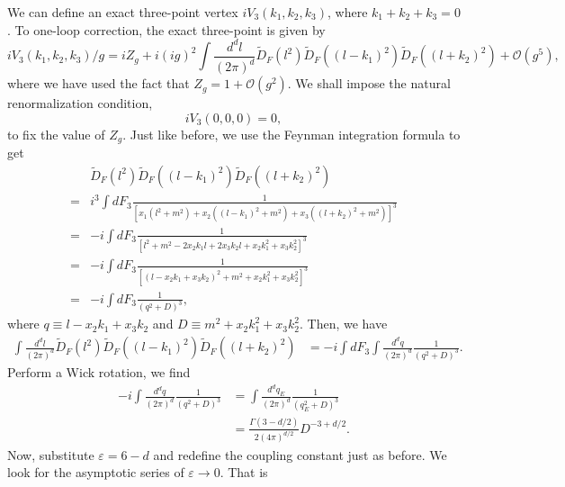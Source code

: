We can define an exact three-point vertex $iV_3(k_1,k_2,k_3)$, where $k_1+k_2+k_3 =0$. To one-loop correction, the exact three-point is given by
\begin{equation}
    iV_3(k_1, k_2,k_3)/g = iZ_g  + i(ig)^2\int\frac{d^dl}{(2\pi)^d}\tilde{D}_F(l^2)\tilde{D}_F((l-k_1)^2) \tilde{D}_F((l+k_2)^2) + \mathcal{O}(g^5),    
\end{equation}
where we have used the fact that $Z_g = 1 + \mathcal{O}(g^2)$. We shall impose the natural renormalization condition,
\begin{equation}
    iV_3(0,0,0) = 0,
\end{equation}
to fix the value of $Z_g$. Just like before, we use the Feynman integration formula to get
\begin{equation}
\begin{aligned}
    &\tilde{D}_F(l^2)\tilde{D}_F((l-k_1)^2) \tilde{D}_F((l+k_2)^2)\\ =& i^3\int dF_3\frac{1}{[x_1(l^2+m^2) + x_2((l-k_1)^2+m^2) + x_3((l+k_2)^2+m^2)]^3}\\
    =&-i\int dF_3\frac{1}{[l^2+m^2-2x_2k_1l + 2x_3k_2l+x_2k_1^2 + x_3k_2^2]^3}\\
    =&-i\int dF_3\frac{1}{[(l - x_2k_1 + x_3k_2)^2 + m^2 + x_2k_1^2 + x_3k_2^2]^3}\\
    =&-i\int dF_3 \frac{1}{(q^2+D)^3},
\end{aligned}
\end{equation}
where $q\equiv l -x_2k_1 + x_3k_2$ and $D \equiv m^2 + x_2k_1^2 + x_3k_2^2$. Then, we have
\begin{equation}
\begin{aligned}
    \int\frac{d^dl}{(2\pi)^d}\tilde{D}_F(l^2)\tilde{D}_F((l-k_1)^2) \tilde{D}_F((l+k_2)^2) & = -i\int dF_3 \int\frac{d^dq}{(2\pi)^d}\frac{1}{(q^2+D)^3}.
\end{aligned}
\end{equation}
Perform a Wick rotation, we find
\begin{equation}
\begin{aligned}
    -i\int\frac{d^dq}{(2\pi)^d}\frac{1}{(q^2+D)^3} &= \int\frac{d^dq_E}{(2\pi)^d}\frac{1}{(q_E^2+D)^3}\\
    &=\frac{\Gamma(3-d/2)}{2(4\pi)^{d/2}}D^{-3+d/2}.
\end{aligned}
\end{equation}
Now, substitute $\varepsilon = 6-d$ and redefine the coupling constant just as before. We look for the asymptotic series of $\varepsilon\to0$. That is
